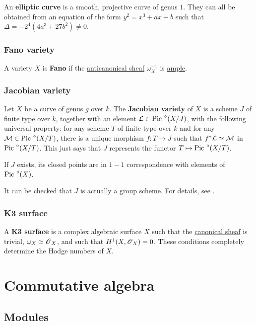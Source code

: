 \documentclass[11pt, english]{article}
\begin{document}
An \textbf{elliptic curve} is a smooth, projective curve of genus $1$. They can all be obtained from an equation of the form $y^2=x^3+ax+b$ such that $\Delta = -2^4(4a^3+27b^2) \neq 0$. 

\subsubsection{Fano variety}
\label{fano}

A variety $X$ is \textbf{Fano} if the \hyperref[anticanonical]{anticanonical  sheaf} $\omega_X^{-1}$ is \hyperref[amplelinebundle]{ample}.  

\subsubsection{Jacobian variety}
\label{jacobianvariety}

Let $X$ be a curve of genus $g$ over $k$. The \textbf{Jacobian variety} of $X$ is a scheme $J$ of finite type over $k$, together with an element $\mathcal{L} \in \text{Pic }^\circ(X/J)$, with the following universal property: for any scheme $T$ of finite type over $k$ and for any $\mathcal M \in \text{Pic }^\circ(X/T)$, there is a unique morphism $f:T \to J$ such that $f^\ast \mathcal{L} \simeq \mathcal M$ in $\text{Pic }^\circ (X/T)$. This just says that $J$ represents the functor $T \mapsto \text{Pic }^\circ(X/T)$. 

If $J$ exists, its closed points are in $1-1$ correspondence with elements of $\text{Pic }^\circ (X)$.

It can be checked that $J$ is actually a group scheme. For details, see \cite[Ch. IV.4]{hartshorne}.

\subsubsection{K3 surface}
\label{k3}

A \textbf{K3 surface} is a complex algebraic surface $X$ such that the \hyperref[canonicaldivisor]{canonical sheaf} is trivial, $\omega_X \simeq \operatorname{\mathscr{O}}_X$, and such that $H^1(X,\operatorname{\mathscr{O}}_X)=0$. These conditions completely determine the Hodge numbers of $X$.

\section{Commutative algebra}
\subsection{Modules}
\end{document}
